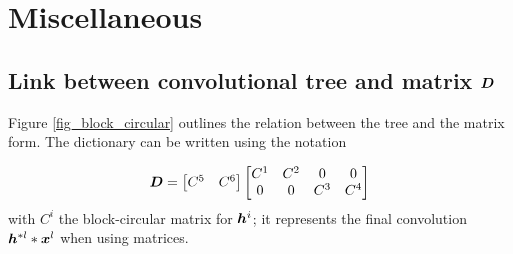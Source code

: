 \clearpage
{}
\appendix

\chapter{Miscellaneous}


\section{Link between convolutional tree and matrix $\bm{D}$} \label{sec_matrix_vs_tree}

Figure \ref{fig_block_circular} outlines the relation between the tree and the matrix form. The dictionary can be written using the notation

$$\bm{D} = \begin{bmatrix}C^5 & C^6\end{bmatrix} \begin{bmatrix}C^1 & C^2 & 0 & 0 \\0 & 0 & C^3 & C^4\end{bmatrix}$$
with $C^i$ the block-circular matrix for $\bm{h}^i$; it represents the final convolution $\bm{h}^{*l}*\bm{x}^l$ when using matrices.

